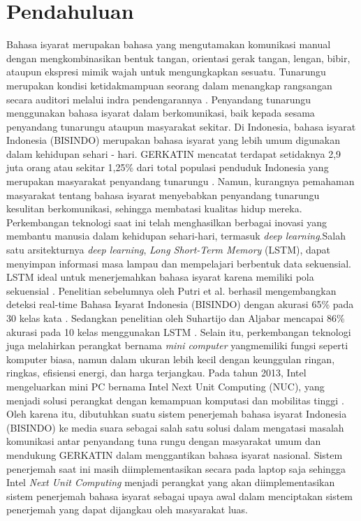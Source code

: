 \section{Pendahuluan}
\label{sec:pendahuluan}


Bahasa isyarat merupakan bahasa yang mengutamakan komunikasi manual dengan mengkombinasikan bentuk tangan, orientasi gerak tangan, lengan, bibir, ataupun ekspresi mimik wajah untuk mengungkapkan sesuatu. Tunarungu merupakan kondisi ketidakmampuan seorang dalam menangkap rangsangan secara auditori melalui indra pendengarannya \cite{maulida2017}. Penyandang tunarungu menggunakan bahasa isyarat dalam berkomunikasi, baik kepada sesama penyandang tunarungu ataupun masyarakat sekitar. Di Indonesia, bahasa isyarat Indonesia (BISINDO) merupakan bahasa isyarat yang lebih umum digunakan dalam kehidupan sehari - hari. GERKATIN mencatat terdapat setidaknya 2,9 juta orang atau sekitar 1,25\% dari total populasi penduduk Indonesia yang merupakan masyarakat penyandang tunarungu \cite{evitasari2015}. Namun, kurangnya pemahaman masyarakat tentang bahasa isyarat menyebabkan penyandang tunarungu kesulitan berkomunikasi, sehingga membatasi kualitas hidup mereka. Perkembangan teknologi saat ini telah menghasilkan berbagai inovasi yang membantu manusia dalam kehidupan sehari-hari, termasuk \emph{deep learning}.Salah satu arsitekturnya \emph{deep learning}, \emph{Long Short-Term Memory} (LSTM), dapat menyimpan informasi masa lampau dan mempelajari berbentuk data sekuensial. LSTM ideal untuk menerjemahkan bahasa isyarat karena memiliki pola sekuensial \cite{sadli2020}. Penelitian sebelumnya oleh Putri et al. berhasil mengembangkan deteksi real-time Bahasa Isyarat Indonesia (BISINDO) dengan akurasi 65\% pada 30 kelas kata \cite{putri2022}. Sedangkan penelitian oleh Suhartijo dan Aljabar mencapai 86\% akurasi pada 10 kelas menggunakan LSTM \cite{aljabar2020}. Selain itu, perkembangan teknologi juga melahirkan perangkat bernama \emph{mini computer} yangmemiliki fungsi seperti komputer biasa, namun dalam ukuran lebih kecil dengan keunggulan ringan, ringkas, efisiensi energi, dan harga terjangkau. Pada tahun 2013, Intel mengeluarkan mini PC bernama Intel Next Unit Computing (NUC), yang menjadi solusi perangkat dengan kemampuan komputasi dan mobilitas tinggi \cite{minny2023}. Oleh karena itu, dibutuhkan suatu sistem penerjemah bahasa isyarat Indonesia (BISINDO) ke media suara sebagai salah satu solusi dalam mengatasi masalah komunikasi antar penyandang tuna rungu dengan masyarakat umum dan mendukung GERKATIN dalam menggantikan bahasa isyarat nasional. Sistem penerjemah saat ini masih diimplementasikan secara pada laptop saja sehingga Intel \emph{Next Unit Computing} menjadi perangkat yang akan diimplementasikan sistem penerjemah bahasa isyarat sebagai upaya awal dalam menciptakan sistem penerjemah yang dapat dijangkau oleh masyarakat luas.
